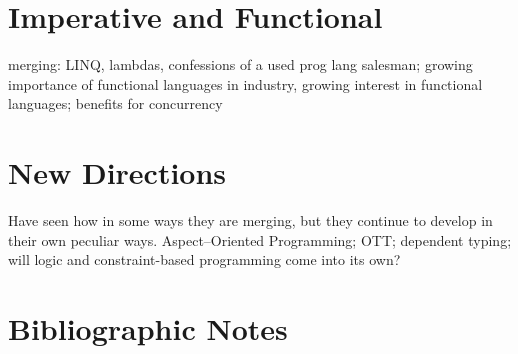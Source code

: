 \label{conclusion:forward}
\section{Imperative and Functional}
merging: LINQ, lambdas, confessions of a used prog lang salesman; growing importance of functional languages in industry, growing interest in functional languages; benefits for concurrency

\section{New Directions}
Have seen how in some ways they are merging, but they continue to develop in their own peculiar ways. Aspect--Oriented Programming; OTT; dependent typing; will logic and constraint-based programming come into its own?

\section{Bibliographic Notes}
